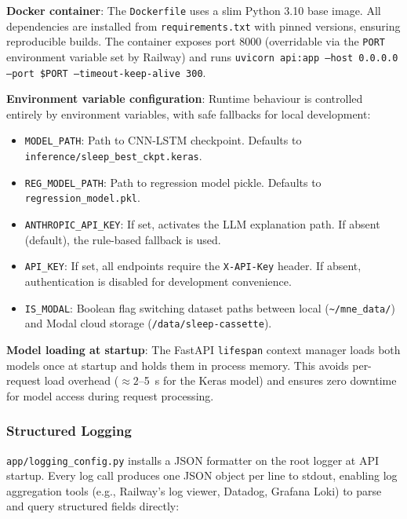 \documentclass[10pt]{article}
\begin{document}
\textbf{Docker container}: The \texttt{Dockerfile} uses a slim Python 3.10 base image. All dependencies are installed from \texttt{requirements.txt} with pinned versions, ensuring reproducible builds. The container exposes port 8000 (overridable via the \texttt{PORT} environment variable set by Railway) and runs \texttt{uvicorn api:app --host 0.0.0.0 --port \$PORT --timeout-keep-alive 300}.

\textbf{Environment variable configuration}: Runtime behaviour is controlled entirely by environment variables, with safe fallbacks for local development:
\begin{itemize}
  \item \texttt{MODEL\_PATH}: Path to CNN-LSTM checkpoint. Defaults to \texttt{inference/sleep\_best\_ckpt.keras}.
  \item \texttt{REG\_MODEL\_PATH}: Path to regression model pickle. Defaults to \texttt{regression\_model.pkl}.
  \item \texttt{ANTHROPIC\_API\_KEY}: If set, activates the LLM explanation path. If absent (default), the rule-based fallback is used.
  \item \texttt{API\_KEY}: If set, all endpoints require the \texttt{X-API-Key} header. If absent, authentication is disabled for development convenience.
  \item \texttt{IS\_MODAL}: Boolean flag switching dataset paths between local (\texttt{\textasciitilde/mne\_data/}) and Modal cloud storage (\texttt{/data/sleep-cassette}).
\end{itemize}

\textbf{Model loading at startup}: The FastAPI \texttt{lifespan} context manager loads both models once at startup and holds them in process memory. This avoids per-request load overhead ($\approx 2$--5~s for the Keras model) and ensures zero downtime for model access during request processing.


\subsubsection{Structured Logging}
\label{sec:structuredLogging}

\texttt{app/logging\_config.py} installs a JSON formatter on the root logger at API startup. Every log call produces one JSON object per line to stdout, enabling log aggregation tools (e.g., Railway's log viewer, Datadog, Grafana Loki) to parse and query structured fields directly:
\end{document}
